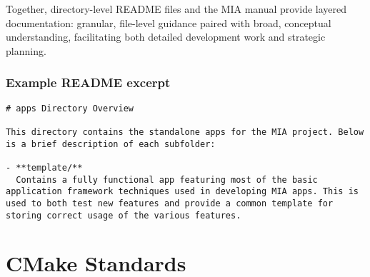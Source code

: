 Together, directory-level README files and the MIA manual provide layered documentation: granular, file-level guidance paired with broad, conceptual understanding, facilitating both detailed development work and strategic planning.

\subsubsection*{Example README excerpt}

\begin{lstlisting}[style=cppstyle]
# apps Directory Overview

This directory contains the standalone apps for the MIA project. Below is a brief description of each subfolder:
  
- **template/**  
  Contains a fully functional app featuring most of the basic application framework techniques used in developing MIA apps. This is used to both test new features and provide a common template for storing correct usage of the various features.
\end{lstlisting}









\section{CMake Standards}


